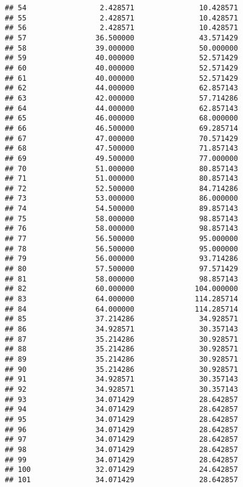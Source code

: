 \documentclass[]{article}
\begin{document}
\begin{verbatim}
## 54                 2.428571               10.428571
## 55                 2.428571               10.428571
## 56                 2.428571               10.428571
## 57                36.500000               43.571429
## 58                39.000000               50.000000
## 59                40.000000               52.571429
## 60                40.000000               52.571429
## 61                40.000000               52.571429
## 62                44.000000               62.857143
## 63                42.000000               57.714286
## 64                44.000000               62.857143
## 65                46.000000               68.000000
## 66                46.500000               69.285714
## 67                47.000000               70.571429
## 68                47.500000               71.857143
## 69                49.500000               77.000000
## 70                51.000000               80.857143
## 71                51.000000               80.857143
## 72                52.500000               84.714286
## 73                53.000000               86.000000
## 74                54.500000               89.857143
## 75                58.000000               98.857143
## 76                58.000000               98.857143
## 77                56.500000               95.000000
## 78                56.500000               95.000000
## 79                56.000000               93.714286
## 80                57.500000               97.571429
## 81                58.000000               98.857143
## 82                60.000000              104.000000
## 83                64.000000              114.285714
## 84                64.000000              114.285714
## 85                37.214286               34.928571
## 86                34.928571               30.357143
## 87                35.214286               30.928571
## 88                35.214286               30.928571
## 89                35.214286               30.928571
## 90                35.214286               30.928571
## 91                34.928571               30.357143
## 92                34.928571               30.357143
## 93                34.071429               28.642857
## 94                34.071429               28.642857
## 95                34.071429               28.642857
## 96                34.071429               28.642857
## 97                34.071429               28.642857
## 98                34.071429               28.642857
## 99                34.071429               28.642857
## 100               32.071429               24.642857
## 101               34.071429               28.642857

\end{verbatim}
\end{document}
